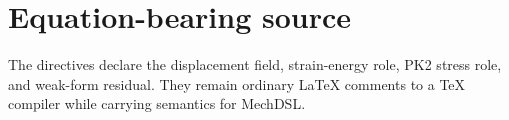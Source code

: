 
\section{Equation-bearing source}

The directives declare the displacement field, strain-energy role, PK2 stress
role, and weak-form residual. They remain ordinary LaTeX comments to a TeX
compiler while carrying semantics for MechDSL.
